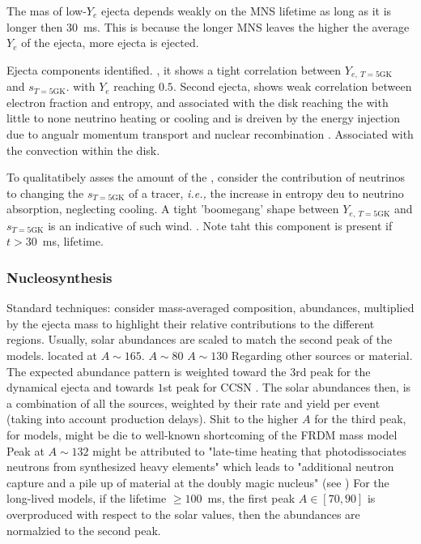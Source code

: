 The mas of low-$Y_e$ ejecta depends weakly on the \ac{MNS} lifetime as long as it is longer then $30$~ms. This is because the longer \ac{MNS} leaves the higher the average $Y_e$ of the ejecta, more ejecta is ejected. 

Ejecta components identified. \nwind{}, it shows a tight correlation between $Y_{e,\:T=5\text{GK}}$ and $s_{T=5\text{GK}}$. with $Y_e$ reaching $0.5$. 
Second ejecta, shows weak correlation between electron fraction and entropy, and associated with the disk reaching the  with little to none neutrino heating or cooling and is dreiven by the energy injection due to angualr momentum transport and nuclear recombination \citep{Metzger:2014ila}. Associated with the convection within the disk.

To qualitatibely asses the amount of the \nwind{}, consider the contribution of neutrinos to changing the $s_{T=5\text{GK}}$ of a tracer, \textit{i.e.,} the increase in entropy deu to neutrino absorption, neglecting cooling. A tight 'boomegang' shape between $Y_{e,\:T=5\text{GK}}$ and $s_{T=5\text{GK}}$ is an indicative of such wind. .
Note taht this component is present if $t>30$~ms, lifetime. 


\subsubsection{Nucleosynthesis}

Standard techniques: consider mass-averaged composition, abundances, multiplied by the ejecta mass to highlight their relative contributions to the different \rproc{} regions. 
Usually, solar abundances are scaled to match the second peak of the models.
 located at $A\sim165$.
 $A\sim80$
 $A\sim130$
Regarding other sources or \rproc{} material. The expected abundance pattern is weighted toward the $3$rd peak for the dynamical ejecta \cite{(e.g., Goriely et al., 2011;  Wanajo et al., 2014; Roberts et al., 2017)} and towards $1$st peak for \ac{CCSN} \cite{(e.g., Wanajo, 2013; Shibagaki et al., 2016; Vlasov et al., 2017)}. The solar \rproc{} abundances then, is a combination of all the sources, weighted by their rate and yield per event (taking into account production delays).
Shit to the higher $A$ for the third peak, for models, might be die to well-known shortcoming of the FRDM mass model \cite{(e.g., Mendoza-Temis et al.,2015; Mumpower et al., 2016)}
Peak at $A\sim132$ might be attributed to "late-time heating that photodissociates neutrons from synthesized heavy elements" which leads to "additional neutron capture and a pile up of material at the doubly magic nucleus" (see \cite{e.g., Wu et al. (2016) })
For the long-lived models, if the lifetime $\geq 100$~ms, the first peak $A\in[70,90]$ is overproduced with respect to the solar values, then the abundances are normalzied to the second peak. 

